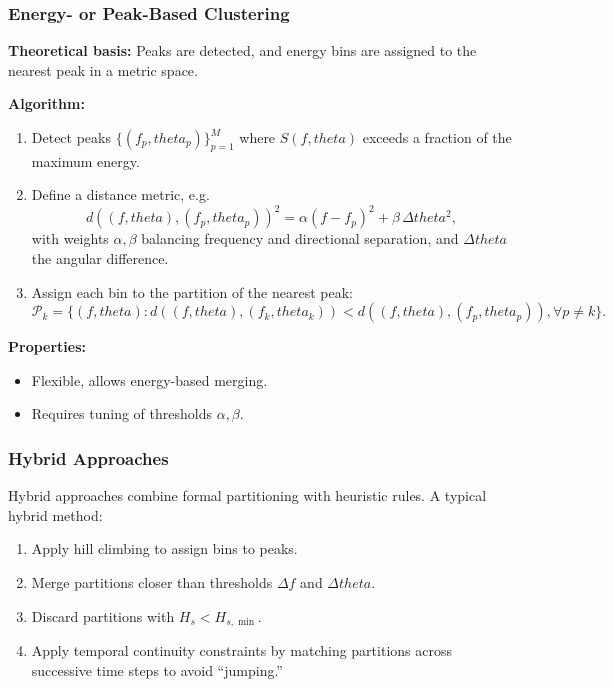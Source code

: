 \documentclass[journal,10pt,twocolumn]{IEEEtran}
\def\theta{theta}%
\begin{document}
    \subsubsection{Energy- or Peak-Based Clustering}
    \textbf{Theoretical basis:} Peaks are detected, and energy bins are assigned to the nearest peak in a metric space.

    \textbf{Algorithm:}
    \begin{enumerate}[leftmargin=1.5em]
        \item Detect peaks $\{(f_p,\theta_p)\}_{p=1}^M$ where $S(f,\theta)$ exceeds a fraction of the maximum energy.
        \item Define a distance metric, e.g.
        \[
            d((f,\theta),(f_p,\theta_p))^2 = \alpha (f-f_p)^2 + \beta \, \Delta\theta^2,
        \]
        with weights $\alpha,\beta$ balancing frequency and directional separation, and $\Delta\theta$ the angular difference.
        \item Assign each bin to the partition of the nearest peak:
        \[
            \mathcal{P}_k = \{(f,\theta) : d((f,\theta),(f_k,\theta_k)) < d((f,\theta),(f_p,\theta_p)), \forall p\neq k \}.
        \]
    \end{enumerate}

    \textbf{Properties:}
    \begin{itemize}[leftmargin=1.4em]
        \item Flexible, allows energy-based merging.
        \item Requires tuning of thresholds $\alpha,\beta$.
    \end{itemize}

    \subsubsection{Hybrid Approaches}
    Hybrid approaches combine formal partitioning with heuristic rules. A typical hybrid method:
    \begin{enumerate}[leftmargin=1.5em]
        \item Apply hill climbing to assign bins to peaks.
        \item Merge partitions closer than thresholds $\Delta f$ and $\Delta\theta$.
        \item Discard partitions with $H_s < H_{s,\min}$.
        \item Apply temporal continuity constraints by matching partitions across successive time steps to avoid ``jumping.''
    \end{enumerate}
\end{document}
